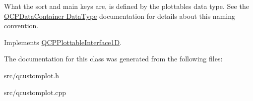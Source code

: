 What the sort and main keys are, is defined by the plottable\textquotesingle{}s data type. See the \hyperlink{classQCPDataContainer_qcpdatacontainer-datatype}{Q\+C\+P\+Data\+Container Data\+Type} documentation for details about this naming convention. 

Implements \hyperlink{classQCPPlottableInterface1D_a229e65e7ab968dd6cd0e259fa504b79d}{Q\+C\+P\+Plottable\+Interface1D}.



The documentation for this class was generated from the following files\+:\begin{DoxyCompactItemize}
\item 
src/qcustomplot.\+h\item 
src/qcustomplot.\+cpp\end{DoxyCompactItemize}

